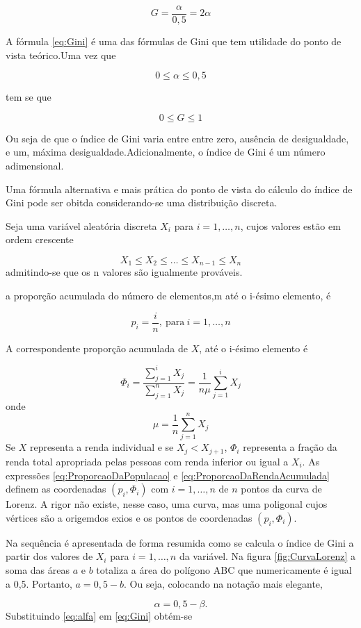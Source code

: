 \documentclass[
]{book}
\begin{document}
\[
G = \dfrac{\alpha}{0,5} = 2\alpha
\label{eq:Gini}
\]

A fórmula \eqref{eq:Gini} é uma das fórmulas de Gini que tem utilidade do ponto de vista teórico.Uma vez que

\[
0 \leq \alpha \leq 0,5
\]

tem se que

\[
0 \leq G \leq 1
\]

Ou seja de que o índice de Gini varia entre entre zero, ausência de desigualdade, e um, máxima desigualdade.Adicionalmente, o índice de Gini é um número adimensional.

Uma fórmula alternativa e mais prática do ponto de vista do cálculo do índice de Gini pode ser obitda considerando-se uma distribuição discreta.

Seja uma variável aleatória discreta \(X_i\) para \(i=1,\ldots,n\), cujos valores estão em ordem crescente

\[
X_1\leq X_2 \leq \ldots \leq X_{n-1} \leq X_n
\]
admitindo-se que os n valores são igualmente prováveis.

a proporção acumulada do número de elementos,m até o i-ésimo elemento, é

\[
p_i = \dfrac{i}{n},~\text{para}~i =1,\ldots, n
\label{eq:ProporcaoDaPopulacao}
\]

A correspondente proporção acumulada de \(X\), até o i-ésimo elemento é

\[
\Phi_i = \dfrac{\sum_{j=1}^{i}X_j}{\sum_{j=1}^{n}X_j} = \dfrac{1}{n\mu}\sum_{j=1}^{i}X_j
\label{eq:ProporcaoDaRendaAcumulada}
\]
onde
\[
\mu = \dfrac{1}{n}\sum_{j=1}^{n}X_j
\]
Se \(X\) representa a renda individual e se \(X_j < X_{j+1}\), \(\Phi_i\) representa a fração da renda total apropriada pelas pessoas com renda inferior ou igual a \(X_i\). As expressões \eqref{eq:ProporcaoDaPopulacao} e \eqref{eq:ProporcaoDaRendaAcumulada} definem as coordenadas \((p_i,\Phi_i)\) com \(i=1,\ldots, n\) de \(n\) pontos da curva de Lorenz. A rigor não existe, nesse caso, uma curva, mas uma poligonal cujos vértices são a origemdos exios e os pontos de coordenadas \((p_i,\Phi_i)\).

Na sequência é apresentada de forma resumida como se calcula o índice de Gini a partir dos valores de \(X_i\) para \(i = 1,\ldots ,n\) da variável. Na figura \ref{fig:CurvaLorenz} a soma das áreas \(a\) e \(b\) totaliza a área do polígono ABC que numericamente é igual a 0,5.
Portanto, \(a = 0,5 - b\). Ou seja, colocando na notação mais elegante,

\[
\alpha = 0,5 - \beta.
\label{eq:alfa}
\]
Substituindo \eqref{eq:alfa} em \eqref{eq:Gini} obtém-se
\end{document}
